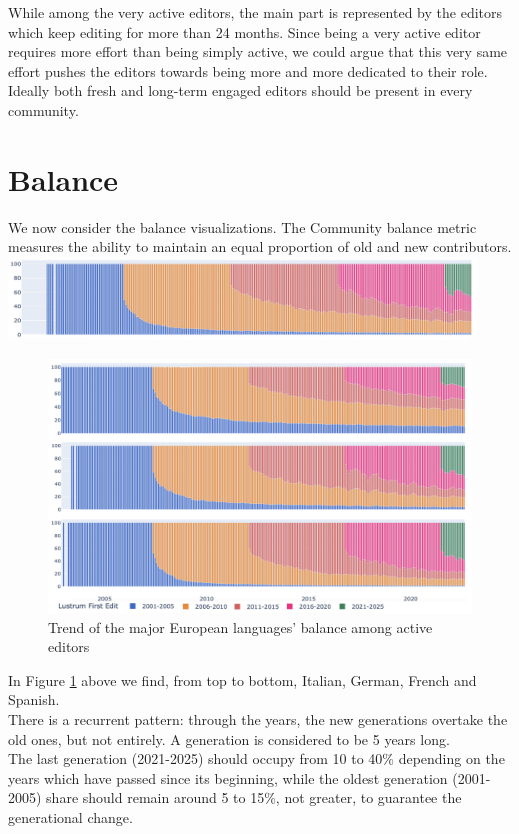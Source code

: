While among the very active editors, the main part is represented by the editors which keep editing for more than 24 months. Since being a very active editor requires more effort than being simply active, we could argue that this very same effort pushes the editors towards being more and more dedicated to their role.\\
Ideally both fresh and long-term engaged editors should be present in every community.

\section{Balance}
\label{sec:balance_conclusion}

We now consider the balance visualizations. The Community balance metric measures the ability to maintain an equal proportion of old and new contributors.\\

\includegraphics[width=470px]{img/balance_trend.png}
\pagebreak
\begin{figure}[h]
    \centering
    \includegraphics[width=470px]{img/balance_trend1.png}
    \caption{Trend of the major European languages' balance among active editors}
    \label{fig:balance_trend}
\end{figure}

In Figure \ref{fig:balance_trend} above we find, from top to bottom, Italian, German, French and Spanish.\\
There is a recurrent pattern: through the years, the new generations overtake the old ones, but not entirely. A generation is considered to be 5 years long.\\
The last generation (2021-2025) should occupy from 10 to 40\% depending on the years which have passed since its beginning, while the oldest generation (2001-2005) share should remain around 
5 to 15\%, not greater, to guarantee the generational change.

